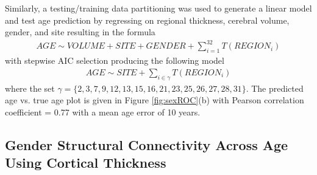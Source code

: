 Similarly, a testing/training data partitioning was used to generate a linear model 
and test age prediction by regressing on regional thickness,
cerebral volume, gender, and site resulting in the formula
\begin{align}
  AGE \sim VOLUME + SITE + GENDER + \sum_{i=1}^{32} T(REGION_{i})
\end{align}
with stepwise AIC selection producing the following model
\begin{align}
  AGE \sim SITE + \sum_{i\in\gamma} T(REGION_{i})
\end{align}
where the set $\gamma = \{2,3,7,9,12,13,15,16, 21,23,25,26,27,28,31\}$.  The predicted age vs. true age plot is given
in Figure \ref{fig:sexROC}(b) with Pearson correlation coefficient = 0.77 with a mean
age error of 10 years.


\subsection{Gender Structural Connectivity Across Age Using Cortical Thickness}


